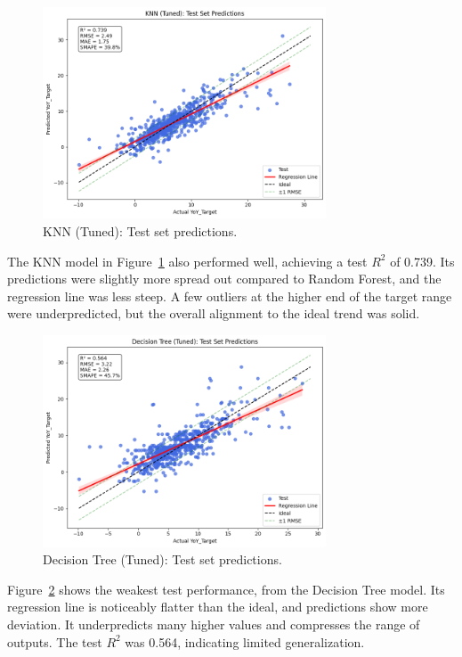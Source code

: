 \begin{figure}[!ht]
    \centering
    \includegraphics[width=0.75\textwidth]{figures/KNN1.png}
    \caption{KNN (Tuned): Test set predictions.}
    \label{fig:knn_pred}
\end{figure}
\FloatBarrier

The KNN model in Figure~\ref{fig:knn_pred} also performed well, achieving a test $R^2$ of 0.739. Its predictions were slightly more spread out compared to Random Forest, and the regression line was less steep. A few outliers at the higher end of the target range were underpredicted, but the overall alignment to the ideal trend was solid.

\begin{figure}[!ht]
    \centering
    \includegraphics[width=0.75\textwidth]{figures/DT1.png}
    \caption{Decision Tree (Tuned): Test set predictions.}
    \label{fig:dt_pred}
\end{figure}
\FloatBarrier

Figure~\ref{fig:dt_pred} shows the weakest test performance, from the Decision Tree model. Its regression line is noticeably flatter than the ideal, and predictions show more deviation. It underpredicts many higher values and compresses the range of outputs. The test $R^2$ was 0.564, indicating limited generalization.

